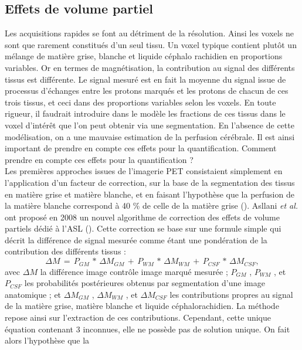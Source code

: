 \subsection{Effets de volume partiel}
\label{sec:volpar}
Les acquisitions rapides se font au détriment de la résolution. Ainsi les voxels ne sont que
rarement constitués d’un seul tissu. Un voxel typique contient plutôt un mélange de matière grise,
blanche et liquide céphalo rachidien en proportions variables. Or en termes de magnétisation, la
contribution au signal des différents tissus est différente. Le signal mesuré est en fait la moyenne du
signal issue de processus d’échanges entre les protons marqués et les protons de chacun de ces trois
tissus, et ceci dans des proportions variables selon les voxels. En toute rigueur, il faudrait introduire
dans le modèle les fractions de ces tissus dans le voxel d’intérêt que l’on peut obtenir via une segmentation. En l’absence de cette modélisation, on a une mauvaise estimation de la perfusion
cérébrale. Il est ainsi important de prendre en compte ces effets pour la quantification. Comment
prendre en compte ces effets pour la quantification ?\\
Les premières approches issues de l’imagerie PET consistaient simplement en l’application
d’un facteur de correction, sur la base de la segmentation des tissus en matière grise et matière
blanche, et en faisant l’hypothèse que la perfusion de la matière blanche correspond à 40 \% de celle
de la matière grise (\cite{Kim2012}). Asllani {\em et al.} ont proposé en 2008 un nouvel algorithme de correction des
effets de volume partiels dédié à l’ASL (\cite{Asllani2008}). Cette correction se base sur une formule simple qui décrit
la différence de signal mesurée comme étant une pondération de la contribution des différents tissus :
\begin{equation}
\label{eq:asllani}
\Delta M\,=\,P_{GM}\,\ast\,\Delta M_{GM}\,+\,P_{WM}\,\ast\,\Delta M_{WM}\,+\,P_{CSF}\,\ast\,\Delta M_{CSF},
\end{equation}
avec $\Delta M$ la différence image contrôle image marqué mesurée ; $P_{GM}$ , $P_{WM}$ , et $P_{CSF}$ les probabilités
postérieures obtenus par segmentation d’une image anatomique ; et $\Delta M_{GM}$ , $\Delta M_{WM}$  , et $\Delta M_{CSF}$  les
contributions propres au signal de la matière grise, matière blanche et liquide céphalorachidien. La
méthode repose ainsi sur l’extraction de ces contributions. Cependant, cette unique équation
contenant 3 inconnues, elle ne possède pas de solution unique. On fait alors l’hypothèse que la
